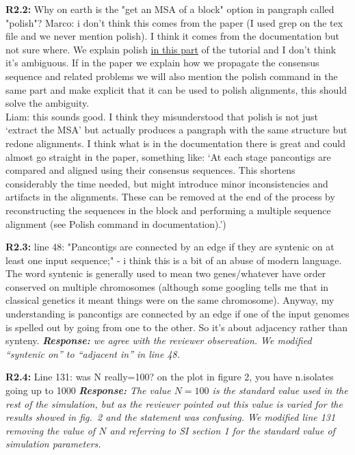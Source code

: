 \documentclass[aps,rmp,onecolumn]{revtex4-1}
\newcommand{\Marco}[1]{{\color{gray}Marco: #1}}
\newcommand{\Liam}[1]{{\color{teal}Liam: #1}}
\newcommand{\reviewer}[2]{\textbf{#1:} #2\vskip 5mm}
\newcommand{\response}[1]{{\it {\color{response}\textbf{Response:} #1}}\vskip 5mm}
\begin{document}
\reviewer{R2.2}{Why on earth is the "get an MSA of a block" option in pangraph called "polish"?}
\Marco{i don't think this comes from the paper (I used grep on the tex file and we never mention polish). I think it comes from the documentation but not sure where. We explain polish \href{https://neherlab.github.io/pangraph/tutorials/tutorial_3/\#Polishing-the-alignments}{in this part} of the tutorial and I don't think it's ambiguous. If in the paper we explain how we propagate the consensus sequence and related problems we will also mention the polish command in the same part and make explicit that it can be used to polish alignments, this should solve the ambiguity.}\\
\Liam{this sounds good. I think they misunderstood that polish is not just `extract the MSA' but actually produces a pangraph with the same structure but redone alignments. I think what is in the documentation there is great and could almost go straight in the paper, something like: `At each stage pancontigs are compared and aligned using their consensus sequences. This shortens considerably the time needed, but might introduce minor inconsistencies and artifacts in the alignments. These can be removed at the end of the process by reconstructing the sequences in the block and performing a multiple sequence alignment (see Polish command in documentation).')}

\reviewer{R2.3}{line 48: "Pancontigs are connected by an edge if they are syntenic on at least one input sequence;" - i think this is a bit of an abuse of modern language. The word syntenic is generally used to mean two genes/whatever have order conserved on multiple chromosomes (although some googling tells me that in classical genetics it meant things were on the same chromosome). Anyway, my understanding is pancontigs are connected by an edge if one of the input genomes is spelled out by going from one to the other. So it's about adjacency rather than synteny.}
\response{we agree with the reviewer observation. We modified ``syntenic on'' to ``adjacent in'' in line 48.}

\reviewer{R2.4}{Line 131: was N really=100? on the plot in figure 2, you have n.isolates going up to 1000}
\response{The value $N=100$ is the standard value used in the rest of the simulation, but as the reviewer pointed out this value is varied for the results showed in fig.~2 and the statement was confusing. We modified line 131 removing the value of $N$ and referring to SI section 1 for the standard value of simulation parameters.}
\end{document}
